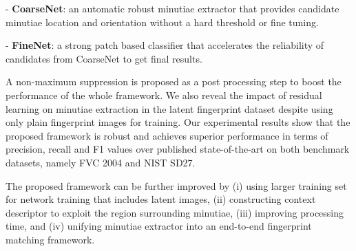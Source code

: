 \documentclass[10pt,twocolumn,letterpaper]{article}
\begin{document}
- {\bfseries CoarseNet}: an automatic robust minutiae extractor that provides candidate minutiae location and orientation without a hard threshold or fine tuning.

- {\bfseries FineNet}: a strong patch based classifier that accelerates the reliability of candidates from CoarseNet to get final results.

A non-maximum suppression is proposed as a post processing step to boost the performance of the whole framework. We also reveal the impact of residual learning on minutiae extraction in the latent fingerprint dataset despite using only plain fingerprint images for training. Our experimental results show that the proposed framework is robust and achieves superior performance in terms of precision, recall and F1 values over published state-of-the-art on both benchmark datasets, namely FVC 2004 and NIST SD27.

The proposed framework can be further improved by (i) using larger training set for network training that includes latent images, (ii) constructing context descriptor to exploit the region surrounding minutiae, (iii) improving processing time, and (iv) unifying minutiae extractor into an end-to-end fingerprint matching framework.

{\footnotesize


}
\end{document}
